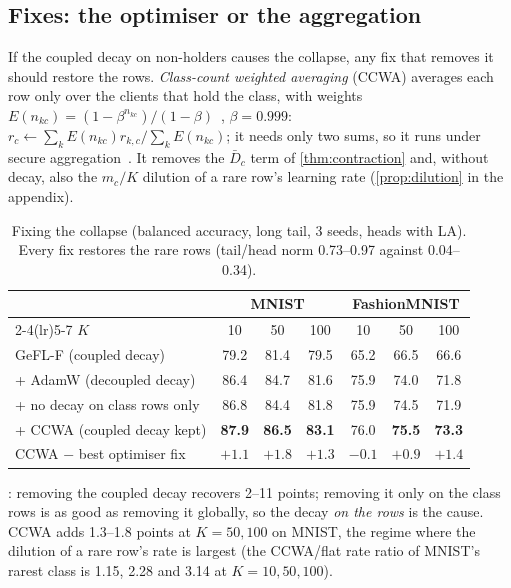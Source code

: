 \documentclass[10pt]{article}
\theoremstyle{plain}
\theoremstyle{definition}
\newcommand{\pos}[1]{\textbf{#1}}
\begin{document}
\subsection{Fixes: the optimiser or the aggregation}

If the coupled decay on non-holders causes the collapse, any fix that removes it should restore the rows.
\emph{Class-count weighted averaging} (CCWA) averages each row only over the clients that hold the class, with weights
$E(n_{kc})=(1-\beta^{n_{kc}})/(1-\beta)$~\cite{cui2019}, $\beta=0.999$:
$r_c\leftarrow\sum_kE(n_{kc})r_{k,c}/\sum_kE(n_{kc})$; it needs only two sums, so it runs under secure
aggregation~\cite{bonawitz2017}. It removes the $\bar D_c$ term of \cref{thm:contraction} and, without decay, also the
$m_c/K$ dilution of a rare row's learning rate (\cref{prop:dilution} in the appendix).

\begin{table}[t]
\centering\small
\caption{Fixing the collapse (balanced accuracy, long tail, 3 seeds, heads with LA). Every fix restores the rare rows
(tail/head norm 0.73--0.97 against 0.04--0.34).}
\label{tab:fixes}
\begin{tabular}{lcccccc}
\toprule
& \multicolumn{3}{c}{MNIST} & \multicolumn{3}{c}{FashionMNIST}\\
\cmidrule(lr){2-4}\cmidrule(lr){5-7}
$K$ & 10 & 50 & 100 & 10 & 50 & 100\\
\midrule
GeFL-F (coupled decay) & 79.2 & 81.4 & 79.5 & 65.2 & 66.5 & 66.6\\
+ AdamW (decoupled decay) & 86.4 & 84.7 & 81.6 & 75.9 & 74.0 & 71.8\\
+ no decay on class rows only & 86.8 & 84.4 & 81.8 & 75.9 & 74.5 & 71.9\\
+ CCWA (coupled decay kept) & \pos{87.9} & \pos{86.5} & \pos{83.1} & 76.0 & \pos{75.5} & \pos{73.3}\\
\midrule
CCWA $-$ best optimiser fix & $+1.1$ & $+1.8$ & $+1.3$ & $-0.1$ & $+0.9$ & $+1.4$\\
\bottomrule
\end{tabular}
\end{table}

: removing the coupled decay recovers 2--11 points; removing it only on the class rows is as good as
removing it globally, so the decay \emph{on the rows} is the cause. CCWA adds 1.3--1.8 points at $K=50,100$ on MNIST,
the regime where the dilution of a rare row's rate is largest (the CCWA/flat rate ratio of MNIST's rarest class is
1.15, 2.28 and 3.14 at $K=10,50,100$).
\end{document}
